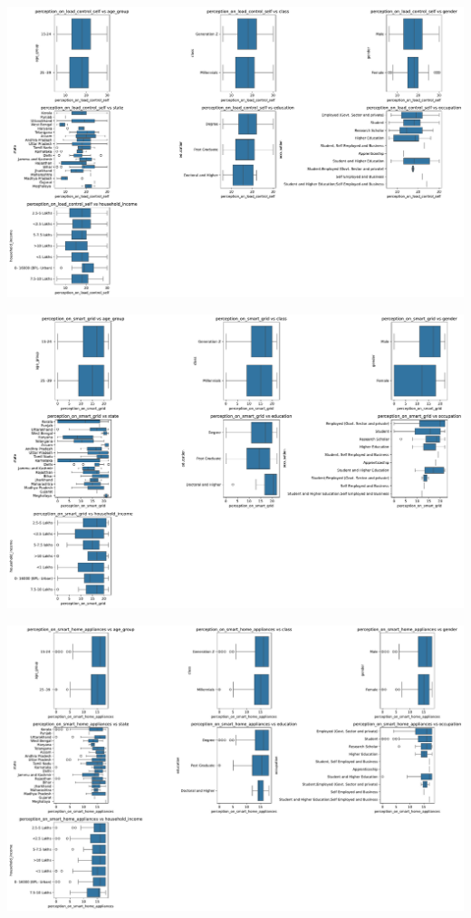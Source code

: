 \documentclass[
  letterpaper,
  DIV=11,
  numbers=noendperiod]{scrartcl}
\begin{document}
\includegraphics{index_files/figure-pdf/cell-5-output-4.pdf}

\includegraphics{index_files/figure-pdf/cell-5-output-5.pdf}

\includegraphics{index_files/figure-pdf/cell-5-output-6.pdf}
\end{document}
